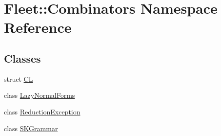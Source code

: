 \hypertarget{namespace_fleet_1_1_combinators}{}\section{Fleet\+:\+:Combinators Namespace Reference}
\label{namespace_fleet_1_1_combinators}
\subsection*{Classes}
\begin{DoxyCompactItemize}
\item 
struct \hyperlink{struct_fleet_1_1_combinators_1_1_c_l}{CL}
\item 
class \hyperlink{class_fleet_1_1_combinators_1_1_lazy_normal_forms}{Lazy\+Normal\+Forms}
\item 
class \hyperlink{class_fleet_1_1_combinators_1_1_reduction_exception}{Reduction\+Exception}
\item 
class \hyperlink{class_fleet_1_1_combinators_1_1_s_k_grammar}{S\+K\+Grammar}
\end{DoxyCompactItemize}
